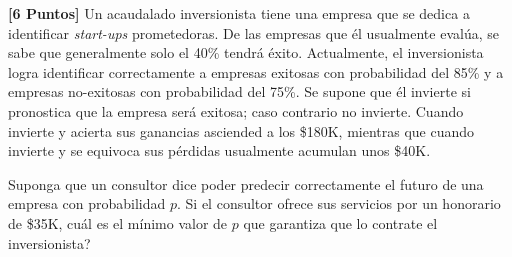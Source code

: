\documentclass[ a4paper, twoside, 11pt]{article}
\begin{document}
\begin{problem}
\textbf{[6 Puntos]} Un acaudalado inversionista tiene una empresa que se dedica a identificar \emph{start-ups} prometedoras. De las empresas que \'el usualmente eval\'ua, se sabe que generalmente solo el 40\% tendr\'a \'exito. Actualmente, el inversionista logra identificar correctamente a empresas exitosas con probabilidad del 85\% y a empresas no-exitosas con probabilidad del 75\%. Se supone que \'el invierte si pronostica que la empresa ser\'a exitosa; caso contrario no invierte. Cuando invierte y acierta sus ganancias asciended a los \$180K, mientras que cuando invierte y se equivoca sus p\'erdidas usualmente acumulan unos \$40K. 

Suponga que un consultor dice poder predecir correctamente el futuro de una empresa con probabilidad $p$. Si el consultor ofrece sus servicios por un honorario de \$35K, cu\'al es el m\'inimo valor de $p$ que garantiza que lo contrate el inversionista? 

\end{problem}
\fullskip
\end{document}
